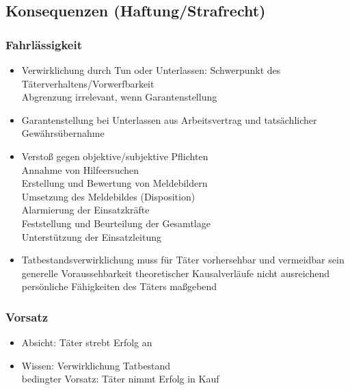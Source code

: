 \subsection{Konsequenzen (Haftung/Strafrecht)}
\begin{normbox}{\subsubsection{Fahrlässigkeit}}
    \begin{itemize}
        \item Verwirklichung durch Tun oder Unterlassen: Schwerpunkt des Täterverhaltens/Vorwerfbarkeit\\
        \ra Abgrenzung irrelevant, wenn Garantenstellung 
        \item Garantenstellung bei Unterlassen aus Arbeitsvertrag und tatsächlicher Gewährsübernahme
        \item Verstoß gegen objektive/subjektive Pflichten\\
        \ra Annahme von Hilfeersuchen\\
        \ra Erstellung und Bewertung von Meldebildern\\
        \ra Umsetzung des Meldebildes (Disposition)\\
        \ra Alarmierung der Einsatzkräfte\\
        \ra Feststellung und Beurteilung der Gesamtlage\\
        \ra Unterstützung der Einsatzleitung
        \item Tatbestandsverwirklichung muss für Täter vorhersehbar und vermeidbar sein\\
        \ra generelle Voraussehbarkeit theoretischer Kausalverläufe nicht ausreichend\\
        \ra persönliche Fähigkeiten des Täters maßgebend
    \end{itemize}
\end{normbox}
\begin{normbox}{\subsubsection{Vorsatz}}
    \begin{itemize}
        \item Absicht: Täter strebt Erfolg an
        \item Wissen: Verwirklichung Tatbestand\\
        \ra bedingter Vorsatz: Täter nimmt Erfolg in Kauf
    \end{itemize}
\end{normbox}
